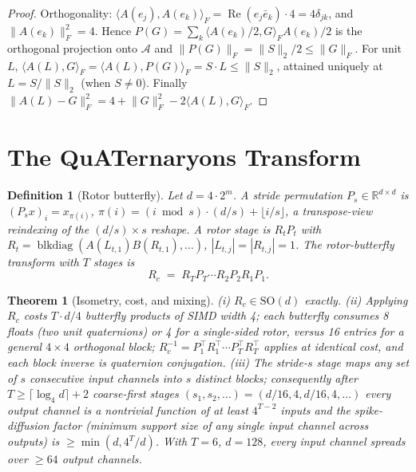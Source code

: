 \documentclass{article}
\newtheorem{theorem}{Theorem}
\newtheorem{definition}{Definition}
\newcommand{\R}{\mathbb{R}}
\newcommand{\SO}{\mathrm{SO}}
\newcommand{\norm}[1]{\lVert #1 \rVert}
\newcommand{\inner}[2]{\langle #1, #2 \rangle}
\begin{document}
\begin{proof}
Orthogonality: $\inner{A(e_j)}{A(e_k)}_F=\operatorname{Re}(e_j\bar e_k)\cdot4=4\delta_{jk}$,
and $\|A(e_k)\|_F^2=4$. Hence $P(G)=\sum_k\inner{A(e_k)/2}{G}_F A(e_k)/2$ is the
orthogonal projection onto $\mathcal{A}$ and
$\norm{P(G)}_F=\norm{S}_2/2\le\norm{G}_F$. For unit $L$,
$\inner{A(L)}{G}_F=\inner{A(L)}{P(G)}_F=S\cdot L\le\norm{S}_2$, attained
uniquely at $L=S/\norm{S}_2$ (when $S\neq0$). Finally
$\norm{A(L)-G}_F^2=4+\norm{G}_F^2-2\inner{A(L)}{G}_F$.
\end{proof}

\section{The QuATernaryons Transform}
\label{sec:method}

\begin{definition}[Rotor butterfly]
\label{def:butterfly}
Let $d=4\cdot2^{m}$. A \emph{stride permutation} $P_s\in\R^{d\times d}$ is
$(P_sx)_i=x_{\pi(i)}$, $\pi(i)=(i\bmod s)\cdot(d/s)+\lfloor i/s\rfloor$, a
transpose-view reindexing of the $(d/s)\times s$ reshape. A \emph{rotor stage}
is $R_tP_t$ with $R_t=\operatorname{blkdiag}(A(L_{t,1})B(R_{t,1}),\dots)$,
$|L_{t,j}|=|R_{t,j}|=1$. The \emph{rotor-butterfly transform} with $T$ stages
is
\[
R_c \;=\; R_TP_T\cdots R_2P_2R_1P_1 .
\]
\end{definition}

\begin{theorem}[Isometry, cost, and mixing]
\label{thm:mixing}
(i) $R_c\in\SO(d)$ exactly. (ii) Applying $R_c$ costs $T\cdot d/4$ butterfly
products of SIMD width 4; each butterfly consumes 8 floats (two unit
quaternions) or 4 for a single-sided rotor, versus 16 entries for a general
$4\times4$ orthogonal block; $R_c^{-1}=P_1^\top R_1^\top\cdots P_T^\top R_T^\top$
applies at identical cost, and each block inverse is quaternion conjugation.
(iii) The stride-$s$ stage maps any set of $s$ consecutive input channels into
$s$ distinct blocks; consequently after
$T\ge\lceil\log_4 d\rceil+2$ coarse-first stages
$(s_1,s_2,\dots)=(d/16,4,d/16,4,\dots)$ every output channel is a
nontrivial function of at least $4^{T-2}$ inputs and the spike-diffusion
factor (minimum support size of any single input channel across outputs) is
$\ge\min(d,4^{T}/d)$. With $T=6$, $d=128$, every input channel spreads over
$\ge64$ output channels.
\end{theorem}
\end{document}

